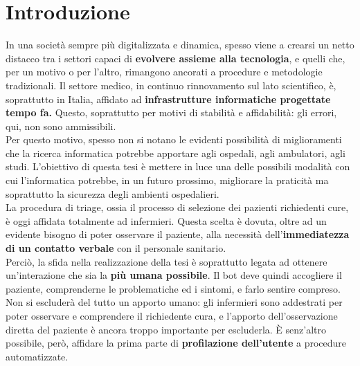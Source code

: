 \chapter{Introduzione}
\label{chap:introduzione}
In una società sempre più digitalizzata e dinamica, spesso viene a crearsi un netto distacco tra i settori capaci di \textbf{evolvere assieme alla tecnologia}, e quelli che, per un motivo o per l'altro, rimangono ancorati a procedure e metodologie tradizionali. Il settore medico, in continuo rinnovamento sul lato scientifico, è, soprattutto in Italia, affidato ad \textbf{infrastrutture informatiche progettate tempo fa.} Questo, soprattutto per motivi di stabilità e affidabilità: gli errori, qui, non sono ammissibili. \\
Per questo motivo, spesso non si notano le evidenti possibilità di miglioramenti che la ricerca informatica potrebbe apportare agli ospedali, agli ambulatori, agli studi.
L'obiettivo di questa tesi è mettere in luce una delle possibili modalità con cui l'informatica potrebbe, in un futuro prossimo, migliorare la praticità ma soprattutto la sicurezza degli ambienti ospedalieri.\\
La procedura di triage, ossia il processo di selezione dei pazienti richiedenti cure, è oggi affidata totalmente ad infermieri. Questa scelta è dovuta, oltre ad un evidente bisogno di poter osservare il paziente, alla necessità dell'\textbf{immediatezza di un contatto verbale} con il personale sanitario. \\
Perciò, la sfida nella realizzazione della tesi è soprattutto legata ad ottenere un'interazione che sia la \textbf{più umana possibile}. Il bot deve quindi accogliere il paziente, comprenderne le problematiche ed i sintomi, e farlo sentire compreso. Non si escluderà del tutto un apporto umano: gli infermieri sono addestrati per poter osservare e comprendere il richiedente cura, e l'apporto dell'osservazione diretta del paziente è ancora troppo importante per escluderla. È senz'altro possibile, però, affidare la prima parte di \textbf{profilazione dell'utente} a procedure automatizzate.
